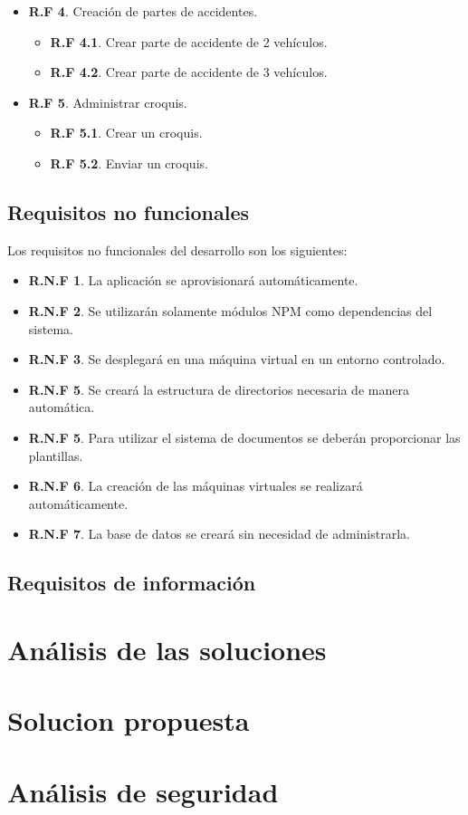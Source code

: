\begin{itemize}
	\item \textbf{R.F 4}. Creación de partes de accidentes.
	\begin{itemize}
		\item \textbf{R.F 4.1}. Crear parte de accidente de 2 vehículos.
		\item \textbf{R.F 4.2}. Crear parte de accidente de 3 vehículos.
	\end{itemize}

	\item \textbf{R.F 5}. Administrar croquis.
	\begin{itemize}
		\item \textbf{R.F 5.1}. Crear un croquis.
		\item \textbf{R.F 5.2}. Enviar un croquis.
	\end{itemize}


\end{itemize}

\subsection{Requisitos no funcionales}
Los requisitos no funcionales del desarrollo son los siguientes: 

\begin{itemize}
	\item \textbf{R.N.F 1}. La aplicación se aprovisionará automáticamente.
	\item \textbf{R.N.F 2}. Se utilizarán solamente módulos NPM como dependencias del sistema. 
	\item \textbf{R.N.F 3}. Se desplegará en una máquina virtual en un entorno controlado.
	\item \textbf{R.N.F 5}. Se creará la estructura de directorios necesaria de manera automática. 
	\item \textbf{R.N.F 5}. Para utilizar el sistema de documentos se deberán proporcionar las plantillas.
	\item \textbf{R.N.F 6}. La creación de las máquinas virtuales se realizará automáticamente.
	\item \textbf{R.N.F 7}. La base de datos se creará sin necesidad de administrarla.
\end{itemize}

\subsection{Requisitos de información}


\section{Análisis de las soluciones}

\section{Solucion propuesta}

\section{Análisis de seguridad}
